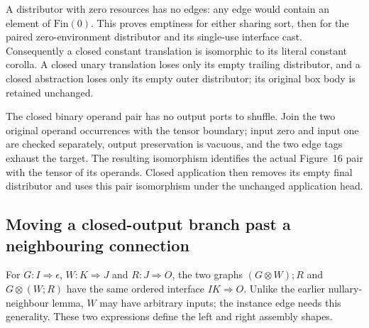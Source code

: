 A distributor with zero resources has no edges: any edge would contain an
element of $\mathrm{Fin}(0)$. This proves emptiness for either sharing sort,
then for the paired zero-environment distributor and its single-use interface
cast. Consequently a closed constant translation is isomorphic to its literal
constant corolla. A closed unary translation loses only its empty trailing
distributor, and a closed abstraction loses only its empty outer distributor;
its original box body is retained unchanged.







The closed binary operand pair has no output ports to shuffle. Join the two
original operand occurrences with the tensor boundary; input zero and input
one are checked separately, output preservation is vacuous, and the two edge
tags exhaust the target. The resulting isomorphism identifies the actual
Figure~16 pair with the tensor of its operands. Closed application then
removes its empty final distributor and uses this pair isomorphism under
the unchanged application head.



\subsection{Moving a closed-output branch past a neighbouring connection}

For $G:I\Rightarrow\epsilon$, $W:K\Rightarrow J$ and $R:J\Rightarrow O$,
the two graphs $(G\otimes W);R$ and $G\otimes(W;R)$ have the same ordered
interface $IK\Rightarrow O$. Unlike the earlier nullary-neighbour lemma,
$W$ may have arbitrary inputs; the instance edge needs this generality.
These two expressions define the left and right assembly shapes.

